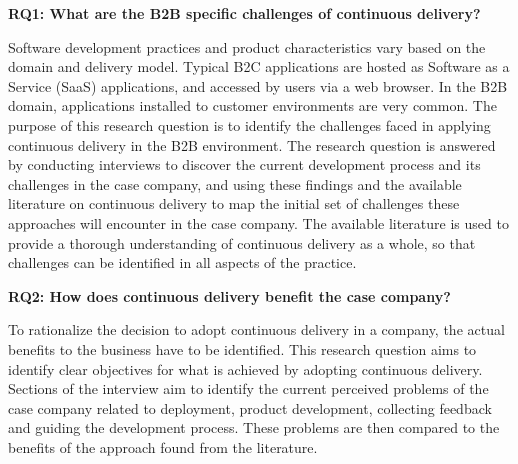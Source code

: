 \documentclass[lnbip]{svmultln}
\begin{document}
\noindent \textbf{RQ1: What are the B2B specific challenges of continuous delivery?}

\noindent Software development practices and product characteristics vary based on the domain and delivery model. Typical B2C applications are hosted as Software as a Service (SaaS) applications, and accessed by users via a web browser. In the B2B domain, applications installed to customer environments are very common. The purpose of this research question is to identify the challenges faced in applying continuous delivery in the B2B environment. The research question is answered by conducting interviews to discover the current development process and its challenges in the case company, and using these findings and the available literature on continuous delivery to map the initial set of challenges these approaches will encounter in the case company. The available literature is used to provide a thorough understanding of continuous delivery as a whole, so that challenges can be identified in all aspects of the practice.
\newline




\noindent \textbf{RQ2: How does continuous delivery benefit the case company?} %

\noindent To rationalize the decision to adopt continuous delivery in a company, the actual benefits to the business have to be identified. This research question aims to identify clear objectives for what is achieved by adopting continuous delivery. Sections of the interview aim to identify the current perceived problems of the case company related to deployment, product development, collecting feedback and guiding the development process. These problems are then compared to the benefits of the approach found from the literature.
\end{document}
